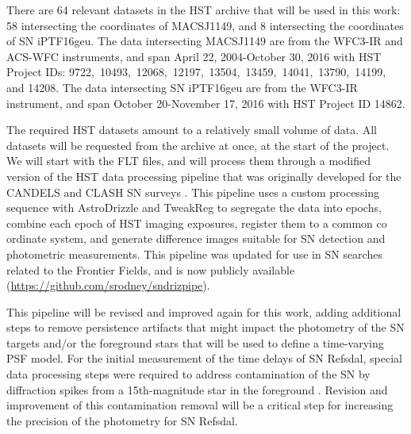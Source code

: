 \forceindent There are 64 relevant datasets in the HST archive that will be used in this work: 58 
intersecting the coordinates of MACSJ1149, and 8 intersecting the coordinates of SN iPTF16geu. 
The data intersecting MACSJ1149 are from the WFC3-IR and 
ACS-WFC instruments, and span April 22, 2004-October 30, 2016 with HST Project IDs: 9722,\ 
10493,\ 12068,\ 12197,\ 13504,\ 13459,\ 14041,\  13790,\ 14199, and 14208. The data intersecting 
SN iPTF16geu are from the WFC3-IR instrument, and span October 20-November 17, 2016 with HST
Project ID 14862.

The required HST datasets amount to a relatively small volume of data.
All datasets will be requested from the archive at once, at the start
of the project. We will start with the FLT files, and will process
them through a modified version of the HST data processing pipeline
that was originally developed for the CANDELS and CLASH SN surveys
\citep{Rodney:2014}.  This pipeline uses a custom processing sequence
with AstroDrizzle and TweakReg to segregate the data into epochs,
combine each epoch of HST imaging exposures, register them to a common
co ordinate system, and generate difference images suitable for SN
detection and photometric measurements. This pipeline was updated for
use in SN searches related to the Frontier Fields, and is now publicly
available (\url{https://github.com/srodney/sndrizpipe}). 

This pipeline will be revised and improved again for this work, adding
additional steps to remove persistence artifacts that might impact the
photometry of the SN targets and/or the foreground stars that will be
used to define a time-varying PSF model. For the initial measurement
of the time delays of SN Refsdal, special data processing steps were
required to address contamination of the SN by diffraction spikes from
a 15th-magnitude star in the foreground \citep{Rodney:2016}.  Revision
and improvement of this contamination removal will be a critical step
for increasing the precision of the photometry for SN Refsdal.



